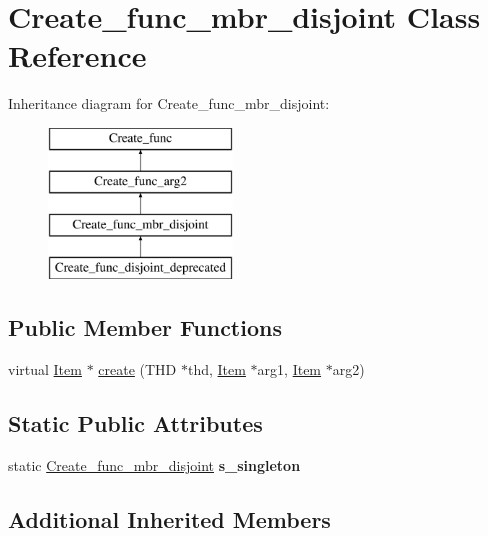 \hypertarget{classCreate__func__mbr__disjoint}{}\section{Create\+\_\+func\+\_\+mbr\+\_\+disjoint Class Reference}
\label{classCreate__func__mbr__disjoint}
Inheritance diagram for Create\+\_\+func\+\_\+mbr\+\_\+disjoint\+:\begin{figure}[H]
\begin{center}
\leavevmode
\includegraphics[height=4.000000cm]{classCreate__func__mbr__disjoint}
\end{center}
\end{figure}
\subsection*{Public Member Functions}
\begin{DoxyCompactItemize}
\item 
virtual \mbox{\hyperlink{classItem}{Item}} $\ast$ \mbox{\hyperlink{classCreate__func__mbr__disjoint_a3971391651f94d51ae53d7caf6b5d695}{create}} (T\+HD $\ast$thd, \mbox{\hyperlink{classItem}{Item}} $\ast$arg1, \mbox{\hyperlink{classItem}{Item}} $\ast$arg2)
\end{DoxyCompactItemize}
\subsection*{Static Public Attributes}
\begin{DoxyCompactItemize}
\item 
\mbox{\label{classCreate__func__mbr__disjoint_a0fb9259894d23b8b0c30eb27cca5ab64}} 
static \mbox{\hyperlink{classCreate__func__mbr__disjoint}{Create\+\_\+func\+\_\+mbr\+\_\+disjoint}} {\bfseries s\+\_\+singleton}
\end{DoxyCompactItemize}
\subsection*{Additional Inherited Members}


